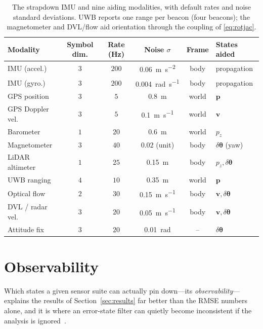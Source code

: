 \documentclass[11pt]{article}
\newcommand{\bp}{\mathbf{p}}
\newcommand{\bv}{\mathbf{v}}
\newcommand{\dtheta}{\delta\bm{\theta}}
\begin{document}
\begin{table}[t]
  \centering
  \small
  \begin{tabular}{lccccl}
    \toprule
    Modality & Symbol dim. & Rate (\si{\hertz}) & Noise $\sigma$ & Frame & States aided \\
    \midrule
    IMU (accel.)        & $3$ & $200$ & \SI{0.06}{\metre\per\second\squared} & body & propagation \\
    IMU (gyro.)         & $3$ & $200$ & \SI{0.004}{\radian\per\second}       & body & propagation \\
    GPS position        & $3$ & $5$   & \SI{0.8}{\metre}      & world & $\bp$ \\
    GPS Doppler vel.    & $3$ & $5$   & \SI{0.1}{\metre\per\second} & world & $\bv$ \\
    Barometer           & $1$ & $20$  & \SI{0.6}{\metre}      & world & $p_z$ \\
    Magnetometer        & $3$ & $40$  & $0.02$ (unit)         & body  & $\dtheta$ (yaw) \\
    LiDAR altimeter     & $1$ & $25$  & \SI{0.15}{\metre}     & body  & $p_z,\dtheta$ \\
    UWB ranging         & $4$ & $10$  & \SI{0.35}{\metre}     & world & $\bp$ \\
    Optical flow        & $2$ & $30$  & \SI{0.15}{\metre\per\second} & body & $\bv,\dtheta$ \\
    DVL / radar vel.    & $3$ & $20$  & \SI{0.05}{\metre\per\second} & body & $\bv,\dtheta$ \\
    Attitude fix        & $3$ & $20$  & \SI{0.01}{\radian}    & --    & $\dtheta$ \\
    \bottomrule
  \end{tabular}
  \caption{The strapdown IMU and nine aiding modalities, with default rates and noise standard
  deviations. UWB reports one range per beacon (four beacons); the magnetometer and DVL/flow aid
  orientation through the coupling of \eqref{eq:rotjac}.}
  \label{tab:sensors}
\end{table}

\section{Observability}
\label{sec:obs}

Which states a given sensor suite can actually pin down---its \emph{observability}---explains the
results of Section~\ref{sec:results} far better than the RMSE numbers alone, and it is where an
error-state filter can quietly become inconsistent if the analysis is ignored~\cite{huang2010,hesch2014}.
\end{document}
